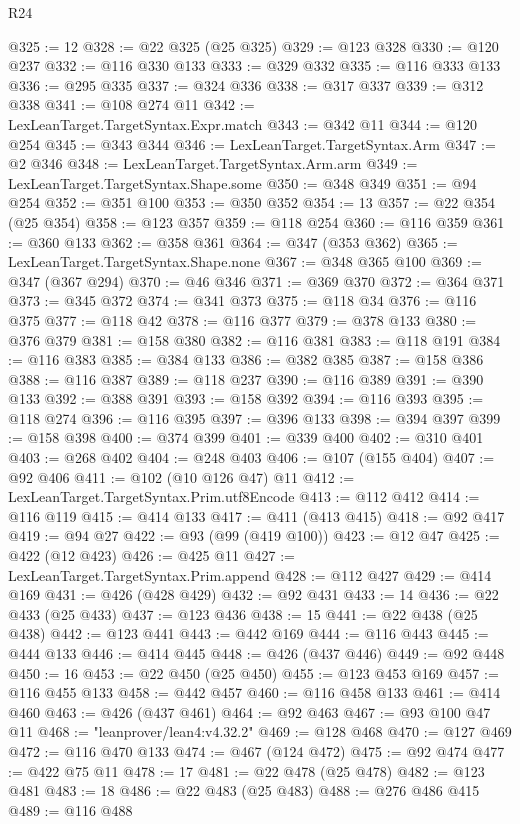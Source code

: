 \begin{lexlean}{R24}
\begin{coremodule}
@325 := 12
@328 := @22 @325 (@25 @325)
@329 := @123 @328
@330 := @120 @237
@332 := @116 @330 @133
@333 := @329 @332
@335 := @116 @333 @133
@336 := @295 @335
@337 := @324 @336
@338 := @317 @337
@339 := @312 @338
@341 := @108 @274 @11
@342 := LexLeanTarget.TargetSyntax.Expr.match
@343 := @342 @11
@344 := @120 @254
@345 := @343 @344
@346 := LexLeanTarget.TargetSyntax.Arm
@347 := @2 @346
@348 := LexLeanTarget.TargetSyntax.Arm.arm
@349 := LexLeanTarget.TargetSyntax.Shape.some
@350 := @348 @349
@351 := @94 @254
@352 := @351 @100
@353 := @350 @352
@354 := 13
@357 := @22 @354 (@25 @354)
@358 := @123 @357
@359 := @118 @254
@360 := @116 @359
@361 := @360 @133
@362 := @358 @361
@364 := @347 (@353 @362)
@365 := LexLeanTarget.TargetSyntax.Shape.none
@367 := @348 @365 @100
@369 := @347 (@367 @294)
@370 := @46 @346
@371 := @369 @370
@372 := @364 @371
@373 := @345 @372
@374 := @341 @373
@375 := @118 @34
@376 := @116 @375
@377 := @118 @42
@378 := @116 @377
@379 := @378 @133
@380 := @376 @379
@381 := @158 @380
@382 := @116 @381
@383 := @118 @191
@384 := @116 @383
@385 := @384 @133
@386 := @382 @385
@387 := @158 @386
@388 := @116 @387
@389 := @118 @237
@390 := @116 @389
@391 := @390 @133
@392 := @388 @391
@393 := @158 @392
@394 := @116 @393
@395 := @118 @274
@396 := @116 @395
@397 := @396 @133
@398 := @394 @397
@399 := @158 @398
@400 := @374 @399
@401 := @339 @400
@402 := @310 @401
@403 := @268 @402
@404 := @248 @403
@406 := @107 (@155 @404)
@407 := @92 @406
@411 := @102 (@10 @126 @47) @11
@412 := LexLeanTarget.TargetSyntax.Prim.utf8Encode
@413 := @112 @412
@414 := @116 @119
@415 := @414 @133
@417 := @411 (@413 @415)
@418 := @92 @417
@419 := @94 @27
@422 := @93 (@99 (@419 @100))
@423 := @12 @47
@425 := @422 (@12 @423)
@426 := @425 @11
@427 := LexLeanTarget.TargetSyntax.Prim.append
@428 := @112 @427
@429 := @414 @169
@431 := @426 (@428 @429)
@432 := @92 @431
@433 := 14
@436 := @22 @433 (@25 @433)
@437 := @123 @436
@438 := 15
@441 := @22 @438 (@25 @438)
@442 := @123 @441
@443 := @442 @169
@444 := @116 @443
@445 := @444 @133
@446 := @414 @445
@448 := @426 (@437 @446)
@449 := @92 @448
@450 := 16
@453 := @22 @450 (@25 @450)
@455 := @123 @453 @169
@457 := @116 @455 @133
@458 := @442 @457
@460 := @116 @458 @133
@461 := @414 @460
@463 := @426 (@437 @461)
@464 := @92 @463
@467 := @93 @100 @47 @11
@468 := "leanprover/lean4:v4.32.2"
@469 := @128 @468
@470 := @127 @469
@472 := @116 @470 @133
@474 := @467 (@124 @472)
@475 := @92 @474
@477 := @422 @75 @11
@478 := 17
@481 := @22 @478 (@25 @478)
@482 := @123 @481
@483 := 18
@486 := @22 @483 (@25 @483)
@488 := @276 @486 @415
@489 := @116 @488

\end{coremodule}
\end{lexlean}
